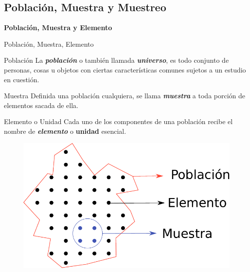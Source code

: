 \documentclass[11pt]{beamer}
\begin{document}
    \subsection{Población, Muestra y Muestreo}
    \begin{frame}
        \centering
        \textbf{\huge Población, Muestra y Elemento}
    \end{frame}
    \begin{frame}{Población, Muestra, Elemento}
        \begin{block}{Población}
            La \textit{\textbf{población}} o también llamada \textbf{\textit{universo}}, es todo conjunto de personas, cosas u objetos con ciertas características comunes sujetos a un estudio en cuestión.
        \end{block}
        \pause
        \begin{block}{Muestra}
            Definida una población cualquiera, se llama \textit{\textbf{muestra}} a toda porción de elementos sacada de ella.
        \end{block}
        \pause
        \begin{block}{Elemento o Unidad}
            Cada uno de los componentes de una población recibe el nombre de \textit{\textbf{elemento}} o \textbf{unidad} esencial.
        \end{block}
    \end{frame}
    \begin{frame}{}
        \begin{figure}
            \centering
            \includegraphics[width=0.9\linewidth]{images/Lecture_1d}
            \label{fig:lecture1d}
        \end{figure}
    \end{frame}
\end{document}
